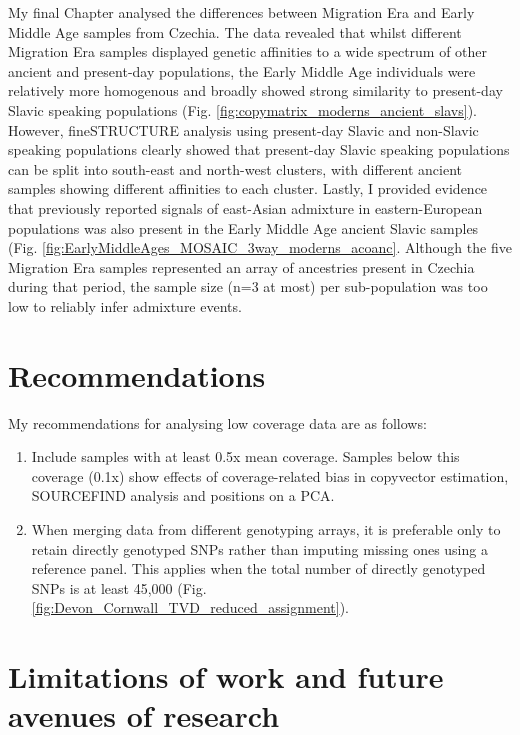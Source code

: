 My final Chapter analysed the differences between Migration Era and Early Middle Age samples from Czechia. The data revealed that whilst different Migration Era samples displayed genetic affinities to a wide spectrum of other ancient and present-day populations, the Early Middle Age individuals were relatively more homogenous and broadly showed strong similarity to present-day Slavic speaking populations (Fig. \ref{fig:copymatrix_moderns_ancient_slavs}). However, fineSTRUCTURE analysis using present-day Slavic and non-Slavic speaking populations clearly showed that present-day Slavic speaking populations can be split into south-east and north-west clusters, with different ancient samples showing different affinities to each cluster. Lastly, I provided evidence that previously reported \cite{Hellenthal2014, MOSAIC_2019} signals of east-Asian admixture in eastern-European populations was also present in the Early Middle Age ancient Slavic samples (Fig. \ref{fig:EarlyMiddleAges_MOSAIC_3way_moderns_acoanc}. Although the five Migration Era samples represented an array of ancestries present in Czechia during that period, the sample size (n=3 at most) per sub-population was too low to reliably infer admixture events.  

\section{Recommendations}

My recommendations for analysing low coverage data are as follows:

\begin{enumerate}
\item Include samples with at least 0.5x mean coverage. Samples below this coverage (0.1x) show effects of coverage-related bias in copyvector estimation, SOURCEFIND analysis and positions on a PCA. 
\item When merging data from different genotyping arrays, it is preferable only to retain directly genotyped SNPs rather than imputing missing ones using a reference panel. This applies when the total number of directly genotyped SNPs is at least 45,000 (Fig. \ref{fig:Devon_Cornwall_TVD_reduced_assignment}).
\end{enumerate}

\section{Limitations of work and future avenues of research}


